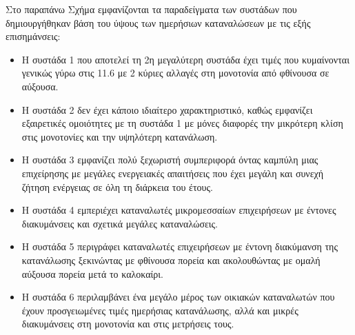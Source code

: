 Στο παραπάνω Σχήμα εμφανίζονται τα παραδείγματα των συστάδων που δημιουργήθηκαν βάση του ύψους των ημερήσιων καταναλώσεων με τις εξής επισημάνσεις:
\begin{itemize}
\item Η συστάδα 1 που αποτελεί τη 2η μεγαλύτερη συστάδα έχει τιμές που κυμαίνονται γενικώς γύρω στις 11.6  με 2 κύριες αλλαγές στη μονοτονία από φθίνουσα σε αύξουσα.
\item Η συστάδα 2 δεν έχει κάποιο ιδιαίτερο χαρακτηριστικό, καθώς εμφανίζει εξαιρετικές ομοιότητες με τη συστάδα 1 με μόνες διαφορές την μικρότερη κλίση στις μονοτονίες και την υψηλότερη κατανάλωση.
\item Η συστάδα 3 εμφανίζει πολύ ξεχωριστή συμπεριφορά όντας καμπύλη μιας επιχείρησης με μεγάλες ενεργειακές απαιτήσεις που έχει μεγάλη και συνεχή ζήτηση ενέργειας σε όλη τη διάρκεια του έτους. 
\item Η συστάδα 4 εμπεριέχει καταναλωτές μικρομεσσαίων επιχειρήσεων με έντονες διακυμάνσεις και σχετικά μεγάλες καταναλώσεις.
\item Η συστάδα 5 περιγράφει καταναλωτές επιχειρήσεων με έντονη διακύμανση της κατανάλωσης ξεκινώντας με φθίνουσα πορεία και ακολουθώντας με ομαλή αύξουσα πορεία μετά το καλοκαίρι.
\item Η συστάδα 6 περιλαμβάνει ένα μεγάλο μέρος των οικιακών καταναλωτών που έχουν προσγειωμένες τιμές ημερήσιας κατανάλωσης, αλλά και μικρές διακυμάνσεις στη μονοτονία και στις μετρήσεις τους.
\end{itemize}
